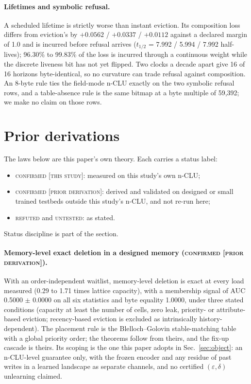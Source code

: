 \documentclass{article} %
\begin{document}
\paragraph{Lifetimes and symbolic refusal.} A scheduled lifetime is strictly worse than instant
eviction. Its composition loss differs from eviction's by $+0.0562$ / $+0.0337$ / $+0.0112$ against a
declared margin of 1.0 and is incurred before refusal arrives ($t_{1/2}$ = 7.992 / 5.994 /
7.992 half-lives); 96.30\% to 99.83\% of the loss is incurred through a continuous weight while the
discrete liveness bit has not yet flipped. %
Two clocks a decade apart give 16 of 16 horizons byte-identical, so no curvature can trade refusal
against composition. An 8-byte rule ties the field-mode n-CLU exactly on the two symbolic refusal rows,
and a table-absence rule is the same bitmap at a byte multiple of 59,392; we make no claim on those
rows. %

\section{Prior derivations}
\label{app:shorts}

The laws below are this paper's own theory. Each carries a status label:
\begin{itemize}[leftmargin=*,nosep]
\item \textsc{confirmed [this study]}: measured on this study's own n-CLU;
\item \textsc{confirmed [prior derivation]}: derived and validated on designed or small trained
  testbeds outside this study's n-CLU, and not re-run here;
\item \textsc{refuted} and \textsc{untested}: as stated.
\end{itemize}
Status discipline is part of the section.


\paragraph{Memory-level exact deletion in a designed memory (\textsc{confirmed [prior
derivation]}).} With an order-independent waitlist, memory-level deletion is exact at every load
measured (0.29 to 1.71 times lattice capacity), with a membership signal of AUC 0.5000 $\pm$ 0.0000 on all
six statistics and byte equality 1.0000, under three stated conditions (capacity at least the number
of cells, zero leak, priority- or attribute-based eviction; recency-based eviction is excluded as
intrinsically history-dependent). %
The placement rule is the Blelloch--Golovin stable-matching table~\citep{blelloch2007strongly} with a global priority order;
the theorems follow from theirs, and the fix-up cascade is theirs. Its scoping is the one this
paper adopts in Sec.~\ref{sec:object}: an n-CLU-level guarantee only, with the frozen encoder and any
residue of past writes in a learned landscape as separate channels, and no certified
$(\varepsilon,\delta)$ unlearning claimed. %
\end{document}
